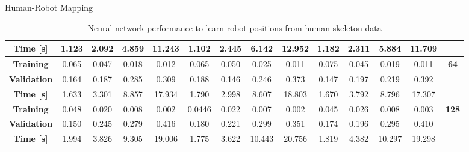 \documentclass[aspectratio=169]{beamer}
\begin{document}
\begin{frame}{Human-Robot Mapping}
\begin{table}[]
{\begin{tabular}{c|cccc|cccc|cccc|c}
			\multicolumn{1}{|c|}{\textbf{Time [s]}} & \multicolumn{1}{c|}{1.123} & \multicolumn{1}{c|}{2.092} & \multicolumn{1}{c|}{4.859} & 11.243 & \multicolumn{1}{c|}{1.102} & \multicolumn{1}{c|}{2.445} & \multicolumn{1}{c|}{6.142} & 12.952 & \multicolumn{1}{c|}{1.182} & \multicolumn{1}{c|}{2.311} & \multicolumn{1}{c|}{5.884} & 11.709 & \multicolumn{1}{c|}{} \\ \hline
			\multicolumn{1}{|c|}{\textbf{Training}} & \multicolumn{1}{c|}{0.065} & \multicolumn{1}{c|}{0.047} & \multicolumn{1}{c|}{0.018} & 0.012  & \multicolumn{1}{c|}{0.065} & \multicolumn{1}{c|}{0.050} & \multicolumn{1}{c|}{0.025} & 0.011  & \multicolumn{1}{c|}{0.075} & \multicolumn{1}{c|}{0.045} & \multicolumn{1}{c|}{0.019} & 0.011  & \multicolumn{1}{c|}{\multirow{3}{*}{\textbf{64}}} \\ \cline{1-13}
			\multicolumn{1}{|c|}{\textbf{Validation}} & \multicolumn{1}{c|}{0.164} & \multicolumn{1}{c|}{0.187} & \multicolumn{1}{c|}{0.285} & 0.309  & \multicolumn{1}{c|}{0.188} & \multicolumn{1}{c|}{0.146} & \multicolumn{1}{c|}{0.246} & 0.373  & \multicolumn{1}{c|}{0.147} & \multicolumn{1}{c|}{0.197} & \multicolumn{1}{c|}{0.219} & 0.392  & \multicolumn{1}{c|}{} \\ \cline{1-13}
			\multicolumn{1}{|c|}{\textbf{Time [s]}} & \multicolumn{1}{c|}{1.633} & \multicolumn{1}{c|}{3.301} & \multicolumn{1}{c|}{8.857} & 17.934 & \multicolumn{1}{c|}{1.790} & \multicolumn{1}{c|}{2.998} & \multicolumn{1}{c|}{8.607} & 18.803 & \multicolumn{1}{c|}{1.670} & \multicolumn{1}{c|}{3.792} & \multicolumn{1}{c|}{8.796} & 17.307 & \multicolumn{1}{c|}{} \\ \hline
			\multicolumn{1}{|c|}{\textbf{Training}} & \multicolumn{1}{c|}{0.048} & \multicolumn{1}{c|}{0.020} & \multicolumn{1}{c|}{0.008} & 0.002  & \multicolumn{1}{c|}{0.0446}  & \multicolumn{1}{c|}{0.022} & \multicolumn{1}{c|}{0.007} & 0.002  & \multicolumn{1}{c|}{0.045} & \multicolumn{1}{c|}{0.026} & \multicolumn{1}{c|}{0.008} & 0.003  & \multicolumn{1}{c|}{\multirow{3}{*}{\textbf{128}}}  \\ \cline{1-13}
			\multicolumn{1}{|c|}{\textbf{Validation}} & \multicolumn{1}{c|}{0.150} & \multicolumn{1}{c|}{0.245} & \multicolumn{1}{c|}{0.279} & 0.416 & \multicolumn{1}{c|}{0.180} & \multicolumn{1}{c|}{0.221} & \multicolumn{1}{c|}{0.299} & 0.351  & \multicolumn{1}{c|}{0.174} & \multicolumn{1}{c|}{0.196} & \multicolumn{1}{c|}{0.295} & 0.410  & \multicolumn{1}{c|}{} \\ \cline{1-13}
			\multicolumn{1}{|c|}{\textbf{Time [s]}} & \multicolumn{1}{c|}{1.994} & \multicolumn{1}{c|}{3.826} & \multicolumn{1}{c|}{9.305} & 19.006 & \multicolumn{1}{c|}{1.775} & \multicolumn{1}{c|}{3.622} & \multicolumn{1}{c|}{10.443}  & 20.756 & \multicolumn{1}{c|}{1.819} & \multicolumn{1}{c|}{4.382} & \multicolumn{1}{c|}{10.297}  & 19.298 & \multicolumn{1}{c|}{} \\ \hline
		\end{tabular}
	}
	\caption{Neural network performance to learn robot positions from human skeleton data}
	\label{tab:nn_results}
\end{table}
\end{frame}
\end{document}
